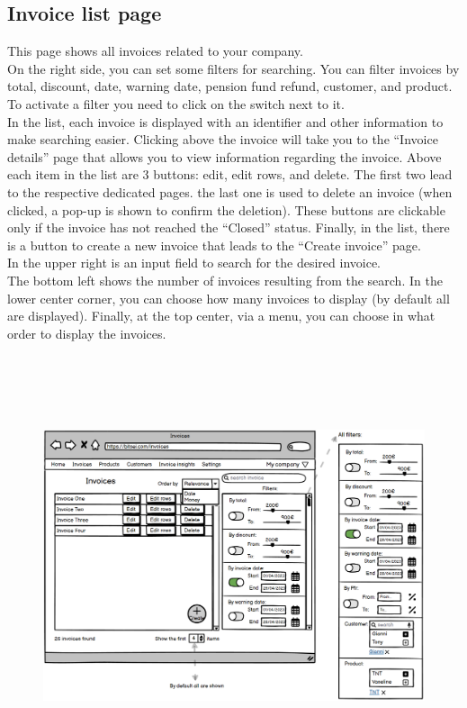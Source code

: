 \subsection{Invoice list page}
This page shows all invoices related to your company. \\
On the right side, you can set some filters for searching. You can filter invoices by total, discount, date, warning date, pension fund refund, customer, and product. To activate a filter you need to click on the switch next to it.\\
In the list, each invoice is displayed with an identifier and other information to make searching easier. Clicking above the invoice will take you to the ``Invoice details'' page that allows you to view information regarding the invoice. Above each item in the list are 3 buttons: edit, edit rows, and delete. The first two lead to the respective dedicated pages. the last one is used to delete an invoice (when clicked, a pop-up is shown to confirm the deletion). These buttons are clickable only if the invoice has not reached the ``Closed'' status. Finally, in the list, there is a button to create a new invoice that leads to the ``Create invoice'' page.\\
In the upper right is an input field to search for the desired invoice.\\
The bottom left shows the number of invoices resulting from the search. In the lower center corner, you can choose how many invoices to display (by default all are displayed). Finally, at the top center, via a menu, you can choose in what order to display the invoices.\\
\begin{figure}[h!]
    \centering
    \includegraphics[height=350pt, keepaspectratio]{resources/mockup/Invoice_list.png}
\end{figure}


